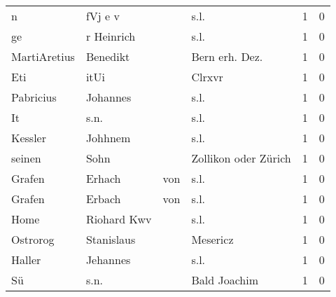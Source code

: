 \begin{tabular}{llllrr}
                        n &                            fVj e v &             &                                        s.l. &          1 &         0 \\
                       ge &                         r Heinrich &             &                                        s.l. &          1 &         0 \\
             MartiAretius &                           Benedikt &             &                             Bern erh. Dez.  &          1 &         0 \\
                      Eti &                               itUi &             &                                      Clrxvr &          1 &         0 \\
                Pabricius &                           Johannes &             &                                        s.l. &          1 &         0 \\
                       It &                               s.n. &             &                                        s.l. &          1 &         0 \\
                  Kessler &                            Johhnem &             &                                        s.l. &          1 &         0 \\
                   seinen &                               Sohn &             &                        Zollikon oder Zürich &          1 &         0 \\
                   Grafen &                             Erhach &         von &                                        s.l. &          1 &         0 \\
                   Grafen &                             Erbach &         von &                                        s.l. &          1 &         0 \\
                     Home &                        Riohard Kwv &             &                                        s.l. &          1 &         0 \\
                 Ostrorog &                         Stanislaus &             &                                    Mesericz &          1 &         0 \\
                   Haller &                           Jehannes &             &                                        s.l. &          1 &         0 \\
                       Sü &                               s.n. &             &                                Bald Joachim &          1 &         0 \\

\end{tabular}

